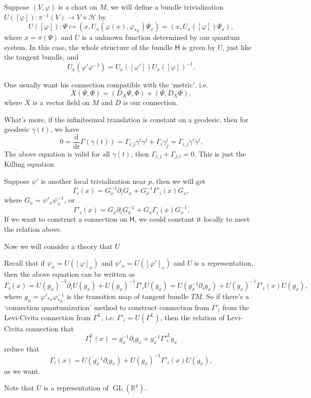 \documentclass[14pt]{extarticle}
\begin{document}
Suppose $(V,\varphi)$ is a chart on $M$, we will define a bundle trivialization $U([\varphi]):\pi^{-1}(V)\to V\times \mathcal H$ by 
\[
	U([\varphi]):\Psi\mapsto (x,U_x(\varphi(x),\varphi_{*x})\Psi_x)=(x,U_x([\varphi])\Psi_x),
\]
where $x=\pi(\Psi)$ and $U$ is a unknown function determined by our quantum system. In this case, the whole structure of the bundle $\mathsf H$ is given by $U$, just like the tangent bundle, and 
\[
	U_x(\varphi'\varphi^{-1})=U_{x}([\varphi'])U_{x}([\varphi])^{-1}.
\]

One usually want his connection compatible with the `metric', i.e.
\[
	X(\Psi,\Phi)=(D_X\Psi,\Phi)+(\Psi,D_X\Phi),
\]
where $X$ is a vector field on $M$ and $D$ is our connection.

What's more, if the infinitesimal translation is constant on a geodesic, then for geodesic $\gamma(t)$, we have
\[
	0=\frac{\mathrm d}{\mathrm dt}\Gamma(\dot\gamma(t))=\Gamma_{i;j}\dot\gamma^i\dot\gamma^j+\Gamma_{i}\ddot\gamma_{j}^i=\Gamma_{i;j}\dot\gamma^i\dot\gamma^j.
\]
The above equation is valid for all $\gamma(t)$, then $\Gamma_{i;j}+\Gamma_{j;i}=0$. This is just the Killing equation.

Suppose $\psi'$ is another local trivialization near $p$, then we will get
\[
	\Gamma_i(x)=G_x^{-1}\partial_i G_x+G^{-1}_x\Gamma'_i(x)G_x,
\]
where $G_x=\psi'_x\psi^{-1}_x$, or 
\[
	\Gamma'_i(x)=G_x\partial_i G_x^{-1}+G_x\Gamma_i(x)G_x^{-1}.
\]
If we want to construct a connection on $\mathsf H$, we could constant it locally to meet the relation above.

Now we will consider a theory that $U$

Recall that if $\psi_x=U([\varphi]_x)$ and $\psi'_x=U([\varphi']_x)$ and $U$ is a representation, then the above equation can be written as
\[
	\Gamma_i(x)=U(g_x)^{-1}\partial_iU(g_x)+U(g_x)^{-1}\Gamma'_iU(g_x)=U(g_x^{-1}\partial_ig_x)+U(g_x)^{-1}\Gamma'_i(x)U(g_x),
\]
where $g_x=\varphi'_{*x}\varphi_{*x}^{-1}$ is the transition map of tangent bundle $TM$. So if there's a `connection quantumization' method to construct connection from $\Gamma'_i$ from the Levi-Civita connection from $\Gamma^L$, i.e. $\Gamma'_i=U(\Gamma^L)$, then the relation of Levi-Civita connection that
\[
	\Gamma^L_i(x)=g_x^{-1}\partial_ig_x+g_x^{-1}{\Gamma'}^L_ig_x
\]
reduce that
\[
	\Gamma_i(x)=U(g_x^{-1}\partial_ig_x)+U(g_x)^{-1}\Gamma'_i(x)U(g_x),
\]
as we want.

Note that $U$ is a representation of $\operatorname{GL}(\mathbb R^4)$.
\end{document}

